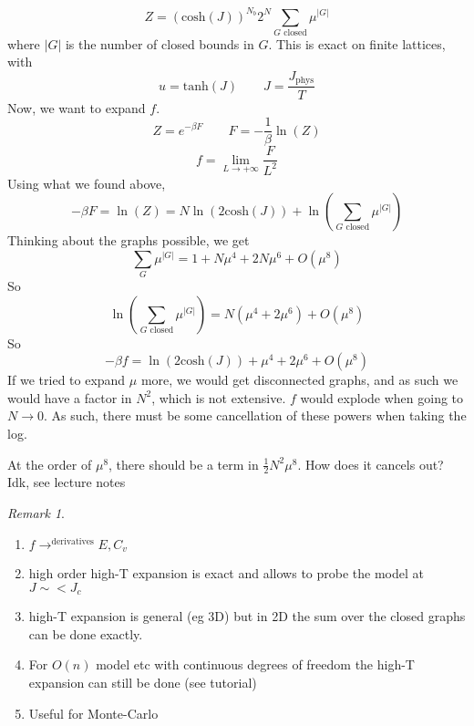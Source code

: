 \documentclass[a4paper]{book}
\theoremstyle{definition}
\theoremstyle{remark}
\newtheorem*{remark}{Remark}
\begin{document}
\begin{equation}
    Z = (\text{cosh}(J))^{N_b}2^N\sum_{G\text{ closed}} \mu^{|G|}
\end{equation}
where $|G|$ is the number of closed bounds in $G$. This is exact on finite lattices, with 
\begin{equation}
    u = \text{tanh}(J) \qquad J = \frac{J_\text{phys}}{T}
\end{equation}
Now, we want to expand $f$. 
\begin{equation}
    Z = e^{-\beta F} \qquad F = -\frac{1}{\beta}\ln(Z)
\end{equation}
\begin{equation}
    f = \lim_{L \rightarrow +\infty} \frac{F}{L^2}
\end{equation}
Using what we found above, 
\begin{equation}
    -\beta F = \ln(Z) = N\ln(2\text{cosh}(J)) + \ln(\sum_{G\text{ closed}}\mu^{|G|})
\end{equation}
Thinking about the graphs possible, we get
\begin{equation}
    \sum_G \mu^{|G|} = 1 + N\mu^4 + 2N\mu^6 + O(\mu^8)
\end{equation}
So 
\begin{equation}
    \ln(\sum_{G\text{ closed}}\mu^{|G|}) = N(\mu^4 + 2\mu^6) + O(\mu^8)
\end{equation}
So 
\begin{equation}
    -\beta f = \ln(2\text{cosh}(J)) + \mu^4 + 2\mu^6 + O(\mu^8)
\end{equation}
If we tried to expand $\mu$ more, we would get disconnected graphs, and as such we would have a factor in $N^2$, which is not extensive. $f$ would explode when going to $N\rightarrow 0$. As such, there must be some cancellation of these powers when taking the log. \par \medskip 

At the order of $\mu^8$, there should be a term in $\frac{1}{2}N^2 \mu^8$. How does it cancels out? Idk, see lecture notes 

\begin{remark}
    \begin{enumerate}
        \item $f \rightarrow^{\text{derivatives}} E, C_v$
        \item high order high-T expansion is exact and allows to probe the model at $J \sim < J_c$
        \item high-T expansion is general (eg 3D) but in 2D the sum over the closed graphs can be done exactly. 
        \item For $O(n)$ model etc with continuous degrees of freedom the high-T expansion can still be done (see tutorial)
        \item Useful for Monte-Carlo
    \end{enumerate}
\end{remark}
\end{document}
